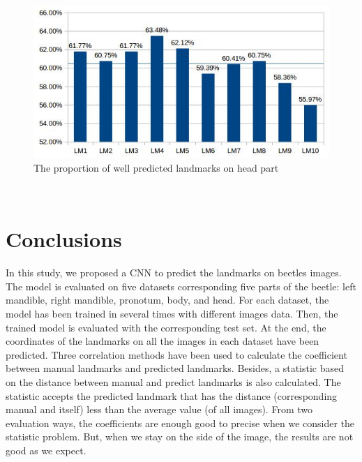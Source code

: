 \documentclass[12pt,a4paper]{article}
\begin{document}
\begin{figure}[h!]
	\centering
	\includegraphics[scale=0.65]{images/tete}
	\caption{The proportion of well predicted landmarks on head part}
	\label{tetefig}
\end{figure}~\\

\section{Conclusions}
In this study, we proposed a CNN to predict the landmarks on beetles images. The model is evaluated on five datasets corresponding five parts of the beetle: left mandible, right mandible, pronotum, body, and head. For each dataset, the model has been trained in several times with different images data. Then, the trained model is evaluated with the corresponding test set. At the end, the coordinates of the landmarks on all the images in each dataset have been predicted. Three correlation methods have been used to calculate the coefficient between manual landmarks and predicted landmarks. Besides, a statistic based on the distance between manual and predict landmarks is also calculated. The statistic accepts the predicted landmark that has the distance (corresponding manual and itself) less than the average value (of all images). From two evaluation ways, the coefficients are enough good to precise when we consider the statistic problem. But, when we stay on the side of the image, the results are not good as we expect.


\pagebreak
\appendix
\label{appendix}
\end{document}
